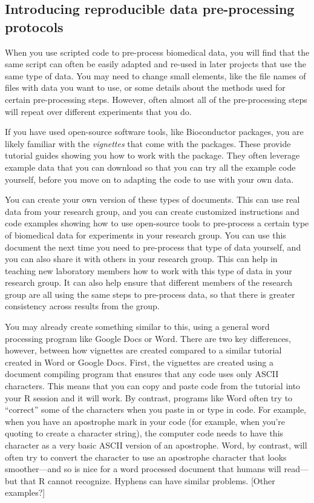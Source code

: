 \documentclass[]{tufte-book}
\begin{document}
\hypertarget{introducing-reproducible-data-pre-processing-protocols}{%
\subsection{Introducing reproducible data pre-processing protocols}\label{introducing-reproducible-data-pre-processing-protocols}}

When you use scripted code to pre-process biomedical data, you will find that
the same script can often be easily adapted and re-used in later projects that
use the same type of data. You may need to change small elements, like the file
names of files with data you want to use, or some details about the methods
used for certain pre-processing steps. However, often almost all of the pre-processing
steps will repeat over different experiments that you do.

If you have used open-source software tools, like Bioconductor packages, you
are likely familiar with the \emph{vignettes} that come with the packages. These
provide tutorial guides showing you how to work with the package. They often
leverage example data that you can download so that you can try all the
example code yourself, before you move on to adapting the code to use with
your own data.

You can create your own version of these types of documents. This can use
real data from your research group, and you can create customized instructions
and code examples showing how to use open-source tools to pre-process a
certain type of biomedical data for experiments in your research group.
You can use this document the next time you need to pre-process that type
of data yourself, and you can also share it with others in your research
group. This can help in teaching new laboratory members how to work with
this type of data in your research group. It can also help ensure that
different members of the research group are all using the same steps to
pre-process data, so that there is greater consistency across results from
the group.

You may already create something similar to this, using a general word
processing program like Google Docs or Word. There are two key differences,
however, between how vignettes are created compared to a similar tutorial
created in Word or Google Docs. First, the vignettes are created using
a document compiling program that ensures that any code uses only ASCII
characters. This means that you can copy and paste code from the tutorial
into your R session and it will work. By contrast, programs like Word often
try to ``correct'' some of the characters when you paste in or type in code.
For example, when you have an apostrophe mark in your code (for example,
when you're quoting to create a character string), the computer code needs
to have this character as a very basic ASCII version of an apostrophe. Word,
by contrast, will often try to convert the character to use an apostrophe
character that looks smoother---and so is nice for a word processed document
that humans will read---but that R cannot recognize. Hyphens can have similar
problems. {[}Other examples?{]}
\end{document}
